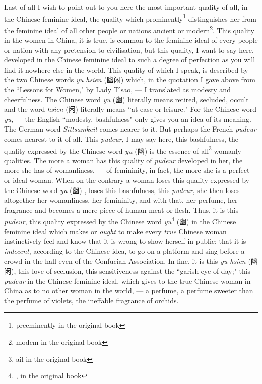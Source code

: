 Last of all I wish to point out to you here the most important quality of all, in the Chinese feminine ideal, the quality which prominently\footnote{preeminently in the original book} distinguishes her from the feminine ideal of all other people or nations ancient or modern\footnote{modem in the original book}.
This quality in the women in China, it is true, is common to the feminine ideal of every people or nation with any pretension to civilisation, but this quality, I want to say here, developed in the Chinese feminine ideal to such a degree of perfection as you will find it nowhere else in the world.
This quality of which I speak, is described by the two Chinese words \emph{yu hsien} (幽闲) which, in the quotation I gave above from the ``Lessons for Women," by Lady T'sao, --- I translated as modesty and cheerfulness.
The Chinese word \emph{yu} (幽) literally means retired, secluded, occult and the word \emph{hsien} (闲) literally means ``at ease or leisure."
For the Chinese word \emph{yu}, --- the English ``modesty, bashfulness" only gives you an idea of its meaning.
The German word \emph{Sittsamkeit} comes nearer to it.
But perhaps the French \emph{pudeur} comes nearest to it of all.
This \emph{pudeur}, I may say here, this bashfulness, the quality expressed by the Chinese word \emph{yu} (幽) is the essence of all\footnote{ail in the original book} womanly qualities.
The more a woman has this quality of \emph{pudeur} developed in her, the more she has of womanliness, --- of femininity, in fact, the more she is a perfect or ideal woman.
When on the contrary a woman loses this quality expressed by the Chinese word \emph{yu} (幽) , loses this bashfulness, this \emph{pudeur}, she then loses altogether her womanliness, her femininity, and with that, her perfume, her fragrance and becomes a mere piece of human meat or flesh.
Thus, it is this \emph{pudeur}, this quality expressed by the Chinese word \emph{yu}\footnote{, in the original book} (幽) in the Chinese feminine ideal which makes or \emph{ought} to make every \emph{true} Chinese woman instinctively feel and know that it is wrong to show herself in public; 
that it is \emph{indecent}, according to the Chinese idea, to go on a platform and sing before a crowd in the hall even of the Confucian Association.
In fine, it is this \emph{yu hsien} (幽闲), this love of seclusion, this sensitiveness against the ``garish eye of day;" this \emph{pudeur} in the Chinese feminine ideal, which gives to the true Chinese woman in China as to no other woman in the world, --- a perfume, a perfume sweeter than the perfume of violets, the ineffable fragrance of orchids.

